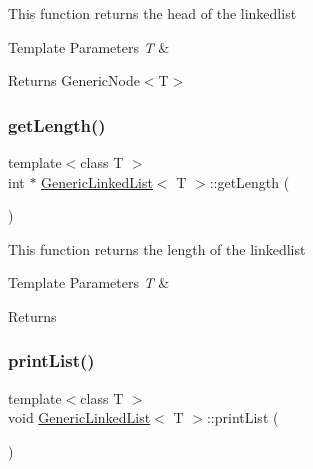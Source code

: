 This function returns the head of the linkedlist 
\begin{DoxyTemplParams}{Template Parameters}
{\em T} & \\
\hline
\end{DoxyTemplParams}
\begin{DoxyReturn}{Returns}
Generic\+Node$<$\+T$>$ 
\end{DoxyReturn}
\mbox{\label{class_generic_linked_list_a73dcf0c040fee02a926ee1dbf2d84227}} 
\subsubsection{\texorpdfstring{getLength()}{getLength()}}
{\footnotesize\ttfamily template$<$class T $>$ \\
int $\ast$ \mbox{\hyperlink{class_generic_linked_list}{Generic\+Linked\+List}}$<$ T $>$\+::get\+Length (\begin{DoxyParamCaption}{ }\end{DoxyParamCaption})}

This function returns the length of the linkedlist 
\begin{DoxyTemplParams}{Template Parameters}
{\em T} & \\
\hline
\end{DoxyTemplParams}
\begin{DoxyReturn}{Returns}

\end{DoxyReturn}
\mbox{\label{class_generic_linked_list_aeac472d4f88ca7a74d9507a1ea46e8a5}} 
\subsubsection{\texorpdfstring{printList()}{printList()}}
{\footnotesize\ttfamily template$<$class T $>$ \\
void \mbox{\hyperlink{class_generic_linked_list}{Generic\+Linked\+List}}$<$ T $>$\+::print\+List (\begin{DoxyParamCaption}{ }\end{DoxyParamCaption})}


